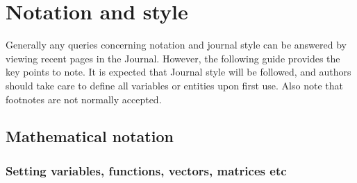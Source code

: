 \documentclass{jfm}
\begin{document}
\section{Notation and style}\label{notstyle}
Generally any queries concerning notation and journal style can be answered by viewing recent pages in the Journal. However, the following guide provides the key points to note. It is expected that Journal style will be followed, and authors should take care to define all variables or entities upon first use. Also note that footnotes are not normally accepted.

\subsection{Mathematical notation}
\subsubsection{Setting variables, functions, vectors, matrices etc}
\end{document}
